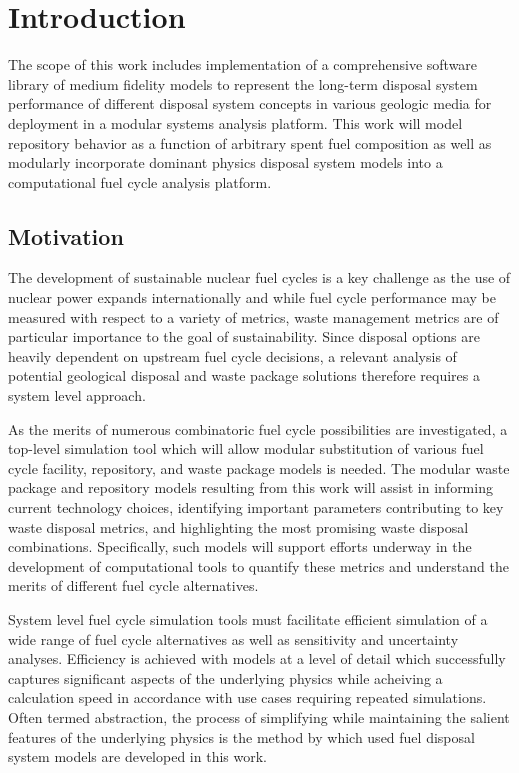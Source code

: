 \chapter{Introduction}\label{ch:introduction}

The scope of this work includes implementation of a comprehensive 
software library of medium fidelity models to represent the long-term 
disposal system performance of different disposal system concepts in 
various geologic media for deployment in a modular systems analysis 
platform.  This work will model repository behavior as a function of 
arbitrary spent fuel composition as well as modularly incorporate 
dominant physics disposal system models into a computational fuel 
cycle analysis platform.

\section{Motivation} 

The development of sustainable nuclear fuel cycles is a key challenge 
as the use of nuclear power expands internationally and while fuel 
cycle performance may be measured with respect to a variety of 
metrics, waste management metrics are of particular importance to the 
goal of sustainability. Since disposal options are heavily dependent 
on upstream fuel cycle decisions, a relevant analysis of potential 
geological disposal and waste package solutions therefore requires a 
system level approach. 

As the merits of numerous combinatoric fuel cycle possibilities are 
investigated, a top-level simulation tool which will allow modular 
substitution of various fuel cycle facility, repository, and waste 
package models is needed. The modular waste package and repository 
models resulting from this work will assist in informing current 
technology choices, identifying important parameters contributing to 
key waste disposal metrics, and highlighting the most promising waste 
disposal combinations. Specifically, such models will support efforts 
underway in the development of computational tools to quantify these 
metrics and understand the merits of different fuel cycle 
alternatives. 

System level fuel cycle simulation tools must facilitate efficient 
simulation of a wide range of fuel cycle alternatives as well as 
sensitivity and uncertainty analyses. Efficiency is achieved with 
models at a level of detail which successfully captures significant 
aspects of the underlying physics while acheiving a calculation speed 
in accordance with use cases requiring repeated simulations. Often 
termed abstraction, the process of simplifying while maintaining the 
salient features of the underlying physics is the method by which used 
fuel disposal system models are developed in this work. 


